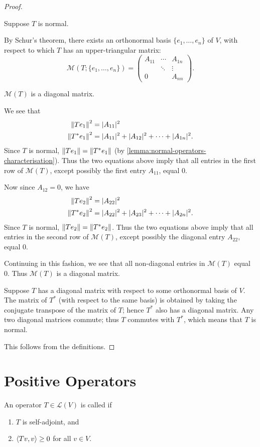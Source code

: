 \begin{proof} \

 Suppose $T$ is normal.

By Schur's theorem, there exists an orthonormal basis $\{e_1,\dots,e_n\}$ of $V$, with respect to which $T$ has an upper-triangular matrix:
\[\mathcal{M}(T;\{e_1,\dots,e_n\})=\begin{pmatrix}
A_{11}&\cdots&A_{1n}\\
&\ddots&\vdots\\
0&&A_{nn}
\end{pmatrix}.\]
\begin{claim}
$\mathcal{M}(T)$ is a diagonal matrix.
\end{claim}
We see that
\begin{align*}
\norm{Te_1}^2&=|A_{11}|^2\\
\norm{T^*e_1}^2&=|A_{11}|^2+|A_{12}|^2+\cdots+|A_{1n}|^2.
\end{align*}
Since $T$ is normal, $\norm{Te_1}=\norm{T^*e_1}$ (by \ref{lemma:normal-operators-characterisation}). Thus the two equations above imply that all entries in the first row of $\mathcal{M}(T)$, except possibly the first entry $A_{11}$, equal $0$.

Now since $A_{12}=0$, we have
\begin{align*}
\norm{Te_2}^2&=|A_{22}|^2\\
\norm{T^*e_2}^2&=|A_{22}|^2+|A_{23}|^2+\cdots+|A_{2n}|^2.
\end{align*}
Since $T$ is normal, $\norm{Te_2}=\norm{T^*e_2}$. Thus the two equations above imply that all entries in the second row of $\mathcal{M}(T)$, except possibly the diagonal entry $A_{22}$, equal $0$.

Continuing in this fashion, we see that all non-diagonal entries in $\mathcal{M}(T)$ equal 0. Thus $\mathcal{M}(T)$ is a diagonal matrix.

 Suppose $T$ has a diagonal matrix with respect to some orthonormal basis of $V$. The matrix of $T^*$ (with respect to the same basis) is obtained by taking the conjugate transpose of the matrix of $T$; hence $T^*$ also has a diagonal matrix. Any two diagonal matrices commute; thus $T$ commutes with $T^*$, which means that $T$ is normal.

 This follows from the definitions.
\end{proof}
\pagebreak

\section{Positive Operators}
\begin{definition}
An operator $T\in\mathcal{L}(V)$ is called  if
\begin{enumerate}[label=(\roman*)]
\item $T$ is self-adjoint, and
\item $\left\langle Tv,v\right\rangle\ge0$ for all $v\in V$.
\end{enumerate}
\end{definition}

